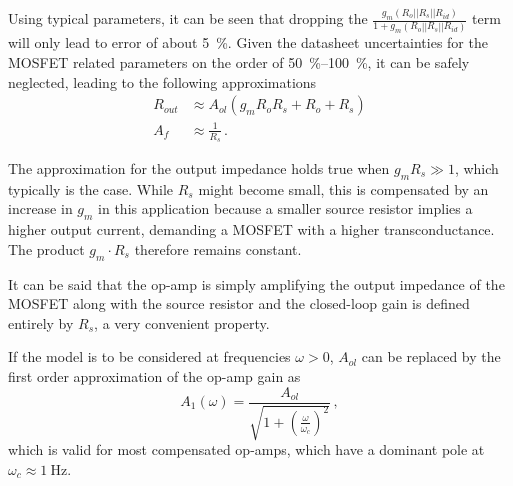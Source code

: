 \documentclass[12pt]{book}
\begin{document}
Using typical parameters, it can be seen that dropping the $\frac{g_m \left(R_o || R_s || R_{id}\right)}{1 + g_m \left(R_o || R_s || R_{id}\right)}$ term will only lead to error of about \qty{5}{\percent}. Given the datasheet uncertainties for the MOSFET related parameters on the order of \qtyrange{50}{100}{\percent}, it can be safely neglected, leading to the following approximations
\begin{align}
    R_{out} &\approx A_{ol} \left(g_m R_o R_s + R_o + R_s \right)\\
    A_f &\approx \frac{1}{R_s} \,. \nonumber
\end{align}

The approximation for the output impedance holds true when $g_m R_s \gg 1$, which typically is the case. While $R_s$ might become small, this is compensated by an increase in $g_m$ in this application because a smaller source resistor implies a higher output current, demanding a MOSFET with a higher transconductance. The product $g_m \cdot R_s$ therefore remains constant.

It can be said that the op-amp is simply amplifying the output impedance of the MOSFET along with the source resistor and the closed-loop gain is defined entirely by $R_s$, a very convenient property.

If the model is to be considered at frequencies $\omega > 0$, $A_{ol}$ can be replaced by the first order approximation of the op-amp gain as
\begin{equation}
    A_1 (\omega) = \frac{A_{ol}}{\sqrt{1 + \left(\frac{\omega}{\omega_c}\right)^2}}\,,\label{eqn:op-amp_gain}
\end{equation}
which is valid for most compensated op-amps, which have a dominant pole at $\omega_c \approx \qty{1}{\Hz}$.
\end{document}
